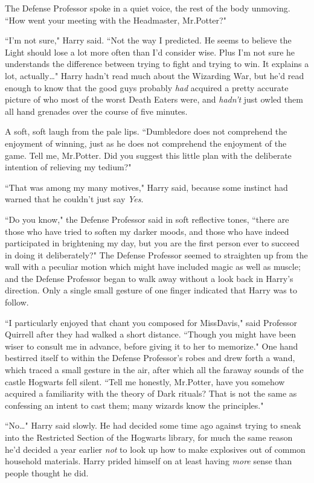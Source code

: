 The Defense Professor spoke in a quiet voice, the rest of the body unmoving. ``How went your meeting with the Headmaster, Mr.\?Potter?"

``I'm not sure," Harry said. ``Not the way I predicted. He seems to believe the Light should lose a lot more often than I'd consider wise. Plus I'm not sure he understands the difference between trying to fight and trying to win. It explains a lot, actually{\ldots}" Harry hadn't read much about the Wizarding War, but he'd read enough to know that the good guys probably \emph{had} acquired a pretty accurate picture of who most of the worst Death Eaters were, and \emph{hadn't} just owled them all hand grenades over the course of five minutes.

A soft, soft laugh from the pale lips. ``Dumbledore does not comprehend the enjoyment of winning, just as he does not comprehend the enjoyment of the game. Tell me, Mr.\?Potter. Did you suggest this little plan with the deliberate intention of relieving my tedium?"

``That was among my many motives," Harry said, because some instinct had warned that he couldn't just say \emph{Yes}.

``Do you know," the Defense Professor said in soft reflective tones, ``there are those who have tried to soften my darker moods, and those who have indeed participated in brightening my day, but you are the first person ever to succeed in doing it deliberately?" The Defense Professor seemed to straighten up from the wall with a peculiar motion which might have included magic as well as muscle; and the Defense Professor began to walk away without a look back in Harry's direction. Only a single small gesture of one finger indicated that Harry was to follow.

``I particularly enjoyed that chant you composed for Miss\?Davis," said Professor Quirrell after they had walked a short distance. ``Though you might have been wiser to consult me in advance, before giving it to her to memorize." One hand bestirred itself to within the Defense Professor's robes and drew forth a wand, which traced a small gesture in the air, after which all the faraway sounds of the castle Hogwarts fell silent. ``Tell me honestly, Mr.\?Potter, have you somehow acquired a familiarity with the theory of Dark rituals? That is not the same as confessing an intent to cast them; many wizards know the principles."

``No{\ldots}" Harry said slowly. He had decided some time ago against trying to sneak into the Restricted Section of the Hogwarts library, for much the same reason he'd decided a year earlier \emph{not} to look up how to make explosives out of common household materials. Harry prided himself on at least having \emph{more} sense than people thought he did.

